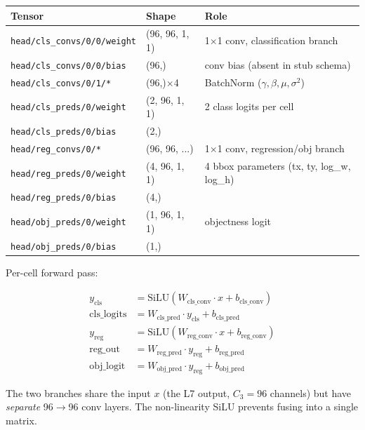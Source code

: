 \documentclass[11pt,a4paper]{article}
\begin{document}
\begin{tabularx}{\linewidth}{lXl}
\toprule
\textbf{Tensor} & \textbf{Shape} & \textbf{Role} \\
\midrule
\texttt{head/cls\_convs/0/0/weight} & (96, 96, 1, 1)             & 1$\times$1 conv, classification branch \\
\texttt{head/cls\_convs/0/0/bias}   & (96,)                       & conv bias (absent in stub schema) \\
\texttt{head/cls\_convs/0/1/*}      & (96,)$\times$4              & BatchNorm (\(\gamma, \beta, \mu, \sigma^2\)) \\
\texttt{head/cls\_preds/0/weight}   & (2, 96, 1, 1)              & 2 class logits per cell \\
\texttt{head/cls\_preds/0/bias}     & (2,)                       & \\
\texttt{head/reg\_convs/0/*}        & (96, 96, ...)              & 1$\times$1 conv, regression/obj branch \\
\texttt{head/reg\_preds/0/weight}   & (4, 96, 1, 1)              & 4 bbox parameters (tx, ty, log\_w, log\_h) \\
\texttt{head/reg\_preds/0/bias}     & (4,)                       & \\
\texttt{head/obj\_preds/0/weight}   & (1, 96, 1, 1)              & objectness logit \\
\texttt{head/obj\_preds/0/bias}     & (1,)                       & \\
\bottomrule
\end{tabularx}

Per-cell forward pass:

\begin{align*}
y_{\text{cls}} &= \mathrm{SiLU}(W_{\text{cls\_conv}} \cdot x + b_{\text{cls\_conv}}) \\
\text{cls\_logits} &= W_{\text{cls\_pred}} \cdot y_{\text{cls}} + b_{\text{cls\_pred}} \\[0.3em]
y_{\text{reg}} &= \mathrm{SiLU}(W_{\text{reg\_conv}} \cdot x + b_{\text{reg\_conv}}) \\
\text{reg\_out} &= W_{\text{reg\_pred}} \cdot y_{\text{reg}} + b_{\text{reg\_pred}} \\
\text{obj\_logit} &= W_{\text{obj\_pred}} \cdot y_{\text{reg}} + b_{\text{obj\_pred}}
\end{align*}

The two branches share the input $x$ (the L7 output, $C_3 = 96$
channels) but have \emph{separate} 96$\to$96 conv layers. The
non-linearity SiLU prevents fusing into a single matrix.
\end{document}
